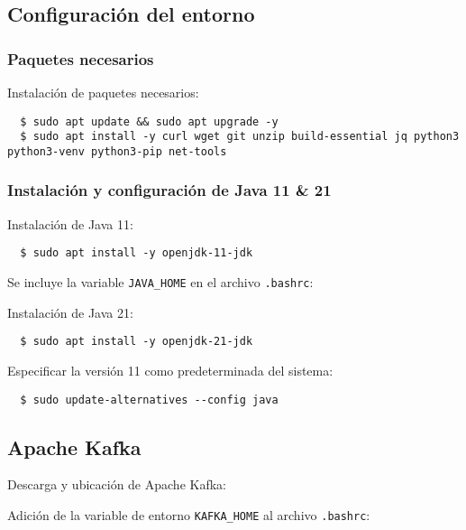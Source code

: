 \documentclass{../../../miPlantilla}
\begin{document}
\subsection{Configuración del entorno}
\subsubsection*{Paquetes necesarios}
\label{anexo:paquetes-vm}

Instalación de paquetes necesarios:
\begin{lstlisting}
  $ sudo apt update && sudo apt upgrade -y
  $ sudo apt install -y curl wget git unzip build-essential jq python3 python3-venv python3-pip net-tools
\end{lstlisting}

\subsubsection*{Instalación y configuración de Java 11 \& 21}
\label{anexo:config-java}

Instalación de Java 11:
\begin{lstlisting}
  $ sudo apt install -y openjdk-11-jdk
\end{lstlisting}

Se incluye la variable \texttt{JAVA\_HOME} en el archivo \texttt{.bashrc}:

Instalación de Java 21:
\begin{lstlisting}
  $ sudo apt install -y openjdk-21-jdk
\end{lstlisting}

Especificar la versión 11 como predeterminada del sistema:
\begin{lstlisting}
  $ sudo update-alternatives --config java
\end{lstlisting}

\subsection{Apache Kafka}
\label{anexo:kafka}

Descarga y ubicación de Apache Kafka:

Adición de la variable de entorno \texttt{KAFKA\_HOME} al archivo \texttt{.bashrc}:
\end{document}
